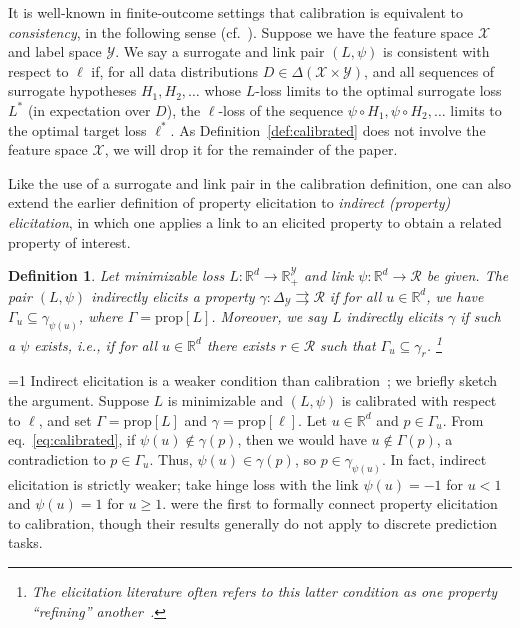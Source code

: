 \documentclass[11pt]{article}
\newcommand{\Comments}{1}
\newcommand{\mytodo}[2]{\ifnum\Comments=1%
  \todo[linecolor=#1!80!black,backgroundcolor=#1,bordercolor=#1!80!black]{#2}\fi}
\newcommand{\btw}[1]{\mytodo{gray!20!white}{BTW: #1}}%
\newcommand{\reals}{\mathbb{R}}
\newcommand{\prop}[1]{\mathrm{prop}[#1]}
\newcommand{\simplex}{\Delta_\Y}
\newcommand{\R}{\mathcal{R}}
\newcommand{\X}{\mathcal{X}}
\newcommand{\Y}{\mathcal{Y}}
\newcommand{\toto}{\rightrightarrows}
\newtheorem{definition}{Definition}
\begin{document}
It is well-known in finite-outcome settings that calibration is equivalent to \emph{consistency}, in the following sense (cf.~\citep{bartlett2006convexity,zhang2004statistical,agarwal2015consistent}).
Suppose we have the feature space $\X$ and label space $\Y$.
We say a surrogate and link pair $(L,\psi)$ is consistent with respect to $\ell$ if, for all data distributions $D \in \Delta(\X \times \Y)$, and all sequences of surrogate hypotheses $H_1,H_2,\ldots$ whose $L$-loss limits to the optimal surrogate loss $L^*$ (in expectation over $D$), the $\ell$-loss of the sequence $\psi\circ H_1,\psi \circ H_2, \ldots$ limits to the optimal target loss $\ell^*$.
As Definition~\ref{def:calibrated} does not involve the feature space $\X$, we will drop it for the remainder of the paper.


Like the use of a surrogate and link pair in the calibration definition, one can also extend the earlier definition of property elicitation to \emph{indirect (property) elicitation}, in which one applies a link to an elicited property to obtain a related property of interest.
\begin{definition}\label{def:indirect-elic}
	Let minimizable loss $L : \reals^d \to \reals^\Y_+$ and link $\psi : \reals^d \to \R$ be given.
  The pair $(L, \psi)$ indirectly elicits a property $\gamma : \simplex \toto \R$ if for all $u \in \reals^d$, we have $\Gamma_u \subseteq \gamma_{\psi(u)}$, where $\Gamma = \prop{L}$.
	Moreover, we say $L$ indirectly elicits $\gamma$ if such a $\psi$ exists, i.e., if for all $u\in\reals^d$ there exists $r\in\R$ such that $\Gamma_u \subseteq \gamma_r$.%
  \footnote{The elicitation literature often refers to this latter condition as one property ``refining'' another~\citep{frongillo2015elicitation}.}
\end{definition}

\btw{Added this paragraph since we needed it in \S~\ref{sec:poly-ie-consistency}}
Indirect elicitation is a weaker condition than calibration~\citep{steinwart2008support,agarwal2015consistent,finocchiaro2021unifying}; we briefly sketch the argument.
Suppose $L$ is minimizable and $(L,\psi)$ is calibrated with respect to $\ell$, and set $\Gamma=\prop{L}$ and $\gamma=\prop{\ell}$.
Let $u\in\reals^d$ and $p\in\Gamma_u$.
From eq.~\eqref{eq:calibrated}, if $\psi(u) \notin \gamma(p)$, then we would have $u\notin\Gamma(p)$, a contradiction to $p\in\Gamma_u$.
Thus, $\psi(u) \in \gamma(p)$, so $p\in\gamma_{\psi(u)}$.
In fact, indirect elicitation is strictly weaker; take hinge loss with the link $\psi(u) = -1$ for $u < 1$ and $\psi(u) = 1$ for $u\geq 1$.
\citet{agarwal2015consistent} were the first to formally connect property elicitation to calibration, though their results generally do not apply to discrete prediction tasks.
\end{document}
